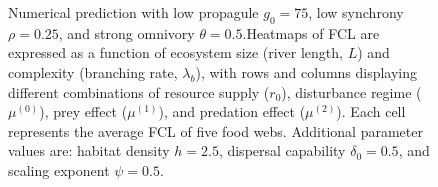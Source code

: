 \begin{figure}
\centering
{}
\caption{Numerical prediction with low propagule \(g_0 = 75\), low
synchrony \(\rho = 0.25\), and strong omnivory \(\theta = 0.5\).Heatmaps
of FCL are expressed as a function of ecosystem size (river length,
\(L\)) and complexity (branching rate, \(\lambda_b\)), with rows and
columns displaying different combinations of resource supply (\(r_0\)),
disturbance regime (\(\mu^{(0)}\)), prey effect (\(\mu^{(1)}\)), and
predation effect (\(\mu^{(2)}\)). Each cell represents the average FCL
of five food webs. Additional parameter values are: habitat density
\(h=2.5\), dispersal capability \(\delta_0=0.5\), and scaling exponent
\(\psi=0.5\).}
\end{figure}

\newpage

